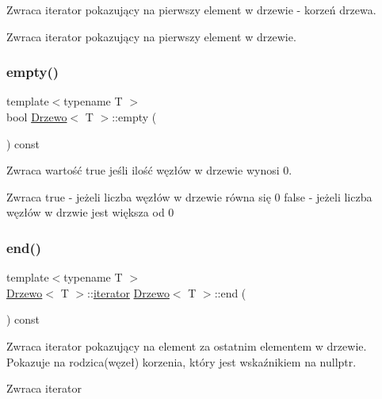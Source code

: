 Zwraca iterator pokazujący na pierwszy element w drzewie -\/ korzeń drzewa.

\begin{DoxyReturn}{Zwraca}
iterator pokazujący na pierwszy element w drzewie. 
\end{DoxyReturn}
\mbox{\label{class_drzewo_af02b0705726b31926a1a3e0b8bbef233}} 
\subsubsection{\texorpdfstring{empty()}{empty()}}
{\footnotesize\ttfamily template$<$typename T $>$ \\
bool \hyperlink{class_drzewo}{Drzewo}$<$ T $>$\+::empty (\begin{DoxyParamCaption}{ }\end{DoxyParamCaption}) const\hspace{0.3cm}{\ttfamily [inline]}}

Zwraca wartość \textquotesingle{}true\textquotesingle{} jeśli ilość węzłów w drzewie wynosi 0.

\begin{DoxyReturn}{Zwraca}
true -\/ jeżeli liczba węzłów w drzewie równa się 0 false -\/ jeżeli liczba węzłów w drzwie jest większa od 0 
\end{DoxyReturn}
\mbox{\label{class_drzewo_aea36f65c42299dd029a38fbf9ed346fb}} 
\subsubsection{\texorpdfstring{end()}{end()}}
{\footnotesize\ttfamily template$<$typename T $>$ \\
\hyperlink{class_drzewo}{Drzewo}$<$ T $>$\+::\hyperlink{class_drzewo_1_1iterator}{iterator} \hyperlink{class_drzewo}{Drzewo}$<$ T $>$\+::end (\begin{DoxyParamCaption}{ }\end{DoxyParamCaption}) const\hspace{0.3cm}{\ttfamily [inline]}}

Zwraca iterator pokazujący na element za ostatnim elementem w drzewie. Pokazuje na rodzica(węzeł) korzenia, który jest wskaźnikiem na \textquotesingle{}nullptr\textquotesingle{}.

\begin{DoxyReturn}{Zwraca}
iterator 
\end{DoxyReturn}
\mbox{\label{class_drzewo_a338ae0e9b48ee6d513b9f99c81da3d4b}} 

